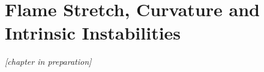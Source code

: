 \chapter{Flame Stretch, Curvature and Intrinsic Instabilities}\label{ch:stretch}

\emph{[chapter in preparation]}

